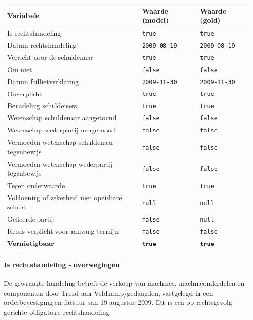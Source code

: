 \documentclass[
  dutch,
  a4paper,
]{article}
\begin{document}
\begin{center}
\small
\begin{tabular}{@{}p{7.4cm}p{2.6cm}p{2.6cm}@{}}
\toprule
Variabele & Waarde (model) & Waarde (gold) \\
\midrule
Is rechtshandeling & \texttt{true} & \texttt{true} \\
Datum rechtshandeling & \texttt{2009-08-19} & \texttt{2009-08-19} \\
Verricht door de schuldenaar & \texttt{true} & \texttt{true} \\
Om niet & \texttt{false} & \texttt{false} \\
Datum faillietverklaring & \texttt{2009-11-30} & \texttt{2009-11-30} \\
Onverplicht & \texttt{true} & \texttt{true} \\
Benadeling schuldeisers & \texttt{true} & \texttt{true} \\
Wetenschap schuldenaar aangetoond & \texttt{false} & \texttt{false} \\
Wetenschap wederpartij aangetoond & \texttt{false} & \texttt{false} \\
Vermoeden wetenschap schuldenaar tegenbewijs & \texttt{false} & \texttt{false} \\
Vermoeden wetenschap wederpartij tegenbewijs & \texttt{false} & \texttt{false} \\
Tegen onderwaarde & \texttt{true} & \texttt{true} \\
Voldoening of zekerheid niet opeisbare schuld & \texttt{null} & \texttt{null} \\
Gelieerde partij & \texttt{false} & \texttt{null} \\
Reeds verplicht voor aanvang termijn & \texttt{false} & \texttt{false} \\
\textbf{Vernietigbaar} & \textbf{\texttt{true}} & \textbf{\texttt{true}} \\
\bottomrule
\end{tabular}
\end{center}

\paragraph{Is rechtshandeling - overwegingen}\label{is-rechtshandeling---overwegingen-67}

De gewraakte handeling betreft de verkoop van machines, machineonderdelen en componenten door Trend aan Veldkamp/gedaagden, vastgelegd in een orderbevestiging en factuur van 19 augustus 2009. Dit is een op rechtsgevolg gerichte obligatoire rechtshandeling.
\end{document}
